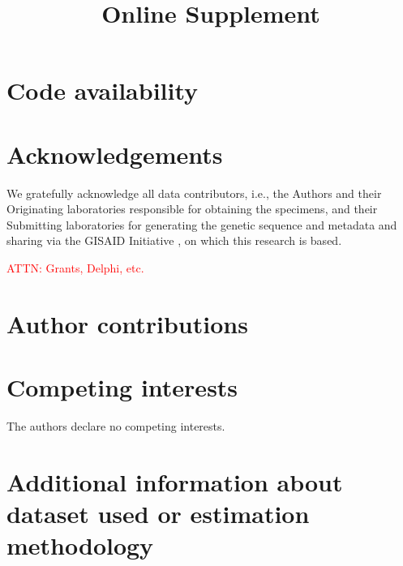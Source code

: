 \documentclass{article}
\newcommand{\beginsupplement}{
  \setcounter{table}{0}  
  \renewcommand{\thetable}{S\arabic{table}} 
  \setcounter{figure}{0} 
  \renewcommand{\thefigure}{S\arabic{figure}}
  \setcounter{section}{0} 
  \renewcommand{\thesection}{S\arabic{section}}
}
\newcommand{\attn }[1]{\textcolor{red}{ATTN: #1}}
\begin{document}
\section*{Code availability}

\clearpage





\section*{Acknowledgements}

We gratefully acknowledge all data contributors, i.e., the Authors and their
Originating laboratories responsible for obtaining the specimens, and their
Submitting laboratories for generating the genetic sequence and metadata and
sharing via the GISAID Initiative \citep{elbe2017data}, on which this research
is based.

\attn{Grants, Delphi, etc.}

\section*{Author contributions}

\section*{Competing interests}

The authors declare no competing interests.





\clearpage
\beginsupplement
\title{\supptitlefont Online Supplement}
\maketitle

\section{Additional information about dataset used or estimation methodology}
\end{document}
